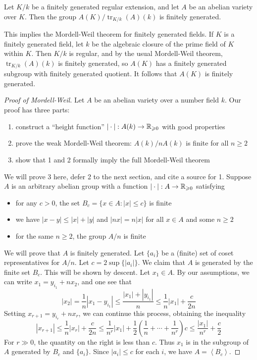 \documentclass{article}
\begin{document}
\begin{theorem}
Let $K/k$ be a finitely generated regular extension, and let $A$ be an abelian 
variety over $K$. Then the group $A(K)/\operatorname{tr}_{K/k}(A)(k)$ is 
finitely generated.
\end{theorem}

This implies the Mordell-Weil theorem for finitely generated fields. If $K$ is 
a finitely generated field, let $k$ be the algebraic closure of the prime field 
of $K$ within $K$. Then $K/k$ is regular, and by the usual Mordell-Weil 
theorem, $\operatorname{tr}_{K/k}(A)(k)$ is finitely generated, so $A(K)$ has a 
finitely generated subgroup with finitely generated quotient. It follows that 
$A(K)$ is finitely generated.

\begin{proof}[Proof of Mordell-Weil]
Let $A$ be an abelian variety over a number field $k$. Our proof has three 
parts:
\begin{enumerate}
  \item construct a ``height function'' $|\cdot|:A(k)\to \mathbb{R}_{\geqslant 0}$ 
    with good properties
  \item prove the weak Mordell-Weil theorem: $A(k)/n A(k)$ is finite for all 
    $n\geqslant 2$
  \item show that 1 and 2 formally imply the full Mordell-Weil theorem 
\end{enumerate}
We will prove 3 here, defer 2 to the next section, and cite a source for 1. 
Suppose $A$ is an arbitrary abelian group with a function 
$|\cdot|:A\to \mathbb{R}_{\geqslant 0}$ satisfying 
\begin{itemize}
  \item for any $c>0$, the set $B_c = \{x\in A:|x|\leqslant c\}$ 
    is finite
  \item we have $|x-y|\leqslant |x|+|y|$ and $|n x|=n |x|$ for all 
    $x\in A$ and some $n\geqslant 2$
  \item for the same $n\geqslant 2$, the group $A/n$ is finite
\end{itemize}
We will prove that $A$ is finitely generated. Let $\{a_i\}$ be a (finite) set 
of coset representatives for $A/n$. Let $c=2\sup \{|a_i|\}$. We claim that $A$ 
is generated by the finite set $B_c$. This will be shown by 
descent. Let $x_1\in A$. By our assumptions, we can write 
$x_1 = y_{i_1} + n x_2$, and one see that 
\[
  |x_2| = \frac 1 n |x_1 - y_{i_1}| 
    \leqslant \frac{|x_1| + |y_{i_1}|}{n} 
    \leqslant \frac 1 n |x_1| + \frac{c}{2 n}
\]
Setting $x_{r+1} = y_{i_r} + n x_r$, we can continue this process, obtaining 
the inequality 
\[
  |x_{r+1}| \leqslant \frac 1 n |x_r| + \frac{c}{2 n}
    \leqslant \frac{1}{n^r} |x_1| + \frac 1 2\left(\frac 1 n + \cdots + \frac{1}{n^r}\right) c 
    \leqslant \frac{|x_1|}{n^r} + \frac c 2
\]
For $r\gg 0$, the quantity on the right is less than $c$. Thus $x_1$ is in the 
subgroup of $A$ generated by $B_c$ and $\{a_i\}$. Since $|a_i|\leqslant c$ for 
each $i$, we have $A=\left\langle B_c\right\rangle$. 
\end{proof}
\end{document}
